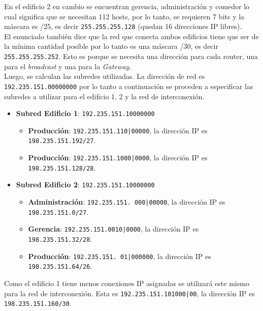 En el edificio 2 en cambio se encuentran gerencia, administración y comedor lo cual significa que se necesitan 112 hosts, por lo tanto, se requieren 7 bits y la máscara es /25, es decir \texttt{255.255.255.128} (quedan 16 direcciones IP libres).\\

El enunciado también dice que la red que conecta ambos edificios tiene que ser de la mínima cantidad posible por lo tanto es una máscara /30, es decir \texttt{255.255.255.252}. Esto es porque se necesita una dirección para cada router, una para el \textit{broadcast} y una para la \textit{Gateway}. \\

Luego, se calculan las subredes utilizadas. La dirección de red es \texttt{192.235.151.00000000} por lo tanto a continuación se proceden a especificar las subredes a utilizar para el edificio 1, 2 y la red de interconexión.\\

\begin{itemize}
    \item \textbf{Subred Edificio 1}: \texttt{192.235.151.10000000} 
    \begin{itemize}
        \item \textbf{Producción}: \texttt{192.235.151.110|00000}, la dirección IP es \texttt{198.235.151.192/27}.
        \item \textbf{Producción}: \texttt{192.235.151.1000|0000}, la dirección IP es \texttt{198.235.151.128/28}.
    \end{itemize}
    \item \textbf{Subred Edificio 2}: \texttt{192.235.151.10000000} 
    \begin{itemize}
        \item \textbf{Administración}: \texttt{192.235.151. 000|00000}, la dirección IP es \texttt{198.235.151.0/27}.
        \item \textbf{Gerencia}: \texttt{192.235.151.0010|0000}, la dirección IP es \texttt{198.235.151.32/28}.
        \item \textbf{Producción}: \texttt{192.235.151. 01|000000}, la dirección IP es \texttt{198.235.151.64/26}.
    \end{itemize}
\end{itemize}

Como el edificio 1 tiene menos conexiones IP asignadas se utilizará este mismo para la red de interconexión. Esta es \texttt{192.235.151.101000|00}, la dirección IP es \texttt{198.235.151.160/30}.\\

